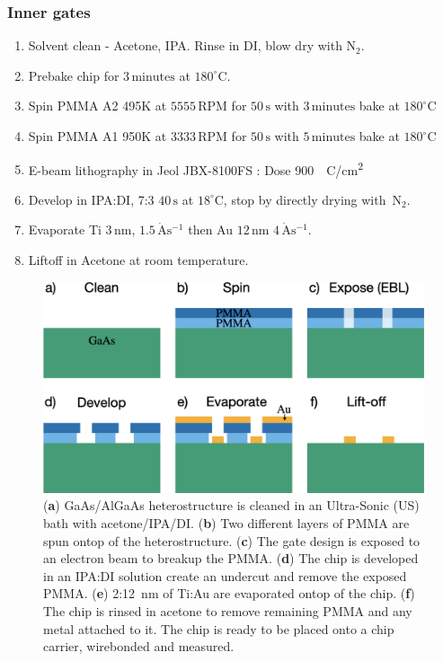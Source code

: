 \subsubsection{Inner gates}

\begin{enumerate}
\item Solvent clean - Acetone, IPA. Rinse in DI, blow dry with $\mathrm{N_2}$.
\item Prebake chip for $3\,\mathrm{minutes}$ at $180^\circ$C.
\item Spin PMMA A2 495K at $5555\,\mathrm{RPM}$ for $50\,\mathrm{s}$  with $3\,\mathrm{minutes}$ bake at $180^\circ$C
\item Spin PMMA A1 950K at $3333\,\mathrm{RPM}$ for $50\,\mathrm{s}$  with $5\,\mathrm{minutes}$ bake at $180^\circ$C
\item E-beam lithography in Jeol JBX-8100FS : Dose \qty{900}{\mu C/cm^2}
\item Develop in IPA:DI, 7:3 $40\,\mathrm{s}$ at $18^\circ$C, stop by directly drying with $\,\mathrm{N_2}$.
\item Evaporate Ti $3\,\mathrm{nm}$, $1.5\,\mathrm{\dot{A}s^{-1}}$ then Au $12\,\mathrm{nm}$ $4\,\mathrm{\dot{A}s^{-1}}$.
\item Liftoff in Acetone at room temperature.
\end{enumerate}



\begin{figure}[!bht]
  \begin{center}
    \includegraphics[width=1.0\textwidth]{figures/appendix/crop_FiguresMaster.020.png}
    \caption[Step-by-step diagram for fabricating metal gates]{\label{fig:appx/gate_fab} 
    (\textbf{a}) GaAs/AlGaAs heterostructure is cleaned in an Ultra-Sonic (US) bath with acetone/IPA/DI. 
    (\textbf{b}) Two different layers of PMMA are spun ontop of the heterostructure.
    (\textbf{c}) The gate design is exposed to an electron beam to breakup the PMMA.
    (\textbf{d}) The chip is developed in an IPA:DI solution create an undercut and remove the exposed PMMA.
    (\textbf{e}) 2:\qty{12}{nm} of Ti:Au are evaporated ontop of the chip.
    (\textbf{f}) The chip is rinsed in acetone to remove remaining PMMA and any metal attached to it. The chip is ready to be placed onto a chip carrier, wirebonded and measured.}
  \end{center}
\end{figure}



